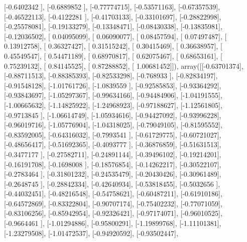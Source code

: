 \documentclass{article}
\begin{document}
       [-0.6402342 ],
       [-0.6889852 ],
       [-0.77774715],
       [-0.53571163],
       [-0.67357539],
       [-0.46522113],
       [-0.4122281 ],
       [-0.41703133],
       [-0.33101697],
       [-0.28822998],
       [-0.25578081],
       [-0.19133279],
       [-0.13348471],
       [-0.08430338],
       [-0.13835981],
       [-0.12036502],
       [ 0.04095099],
       [ 0.06090077],
       [ 0.08457594],
       [ 0.07497487],
       [ 0.13912758],
       [ 0.36327427],
       [ 0.31515242],
       [ 0.30415469],
       [ 0.36638957],
       [ 0.45549547],
       [ 0.54471189],
       [ 0.68970817],
       [ 0.62075467],
       [ 0.68653161],
       [ 0.75239132],
       [ 0.84145525],
       [ 0.87288852],
       [ 1.00681452]]), array([[-0.63701374],
       [-0.88711513],
       [-0.88385393],
       [-0.82533298],
       [-0.768933  ],
       [-0.82834197],
       [-0.91548128],
       [-1.01761726],
       [-1.0839559 ],
       [-0.92585853],
       [-0.93364292],
       [-0.93843697],
       [-1.05297367],
       [-0.99634166],
       [-0.94484906],
       [-1.04191555],
       [-1.00665632],
       [-1.14825922],
       [-1.24968923],
       [-0.97188627],
       [-1.12561805],
       [-0.9713845 ],
       [-1.06614749],
       [-1.05934616],
       [-0.94427092],
       [-0.93996228],
       [-0.96019716],
       [-1.05776904],
       [-1.04318025],
       [-0.79049105],
       [-0.81595552],
       [-0.83592005],
       [-0.64316032],
       [-0.7993541 ],
       [-0.61729775],
       [-0.60721027],
       [-0.48656417],
       [-0.51692365],
       [-0.4093777 ],
       [-0.36876859],
       [-0.51631513],
       [-0.3477177 ],
       [-0.27582711],
       [-0.24891144],
       [-0.39496102],
       [-0.19214201],
       [-0.16191708],
       [-0.1698008 ],
       [-0.18576854],
       [-0.14262217],
       [-0.30522107],
       [-0.2783464 ],
       [-0.31801232],
       [-0.24535479],
       [-0.20430426],
       [-0.30961489],
       [-0.2648745 ],
       [-0.28842334],
       [-0.42640934],
       [-0.53818455],
       [-0.5032656 ],
       [-0.44032451],
       [-0.48216548],
       [-0.54758621],
       [-0.60487211],
       [-0.61910186],
       [-0.64572869],
       [-0.83322804],
       [-0.90707174],
       [-0.75402232],
       [-0.77071059],
       [-0.83106256],
       [-0.85942954],
       [-0.92326421],
       [-0.97174071],
       [-0.96010525],
       [-0.9664461 ],
       [-1.01294886],
       [-0.95800291],
       [-1.19899768],
       [-1.11101381],
       [-1.23279508],
       [-1.01472537],
       [-0.94920592],
       [-0.93502447],
\end{document}
